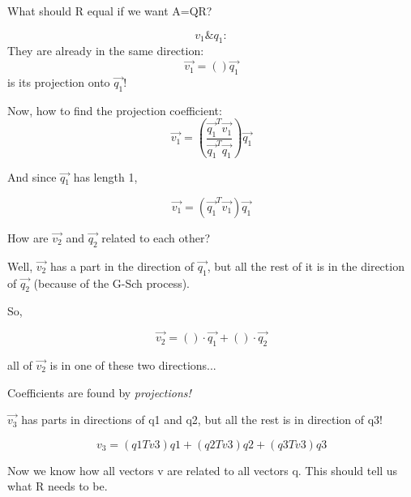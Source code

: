 \documentclass[twocolumn,draft]{article}
\begin{document}
  What should R equal if we want A=QR?
  
  \begin{equation}
  	v_{1} \& q_{1}:
  \end{equation}
  They are already in the same direction:
  \begin{equation}
  	\vec{v_{1}} = ()\vec{q_{1}}
  \end{equation}
  is its projection onto $\vec{q_{1}}$!
  
  Now, how to find the projection coefficient:
  \begin{equation}
  	\vec{v_{1}} = (\frac{\vec{q_{1}}^{T}\vec{v_{1}}}{\vec{q_{1}}^{T}\vec{q_{1}}})\vec{q_{1}}
  \end{equation}
  
  And since $\vec{q{_1}}$ has length 1, 
  
  \begin{equation}
  	\boxed{\vec{v_{1}} = (\vec{q_{1}}^{T}\vec{v_{1}})\vec{q_{1}}}
  \end{equation}
  
  How are $\vec{v_{2}}$ and $\vec{q_{2}}$ related to each other?
  
  Well, $\vec{v_{2}}$ has a part in the direction of $\vec{q_{1}}$, but
  all the rest of it is in the direction of $\vec{q_{2}}$ (because of the G-Sch process).
  
  So,
  
  \begin{equation}
  	\vec{v_{2}}= ( )\cdot \vec{q_{1}} + ( )\cdot \vec{q_{2}}
  \end{equation}
  
  all of $\vec{v_{2}}$ is in one of these two directions...
  
  Coefficients are found by \emph{projections!}
  
 
 $\vec{v_{3}}$ has parts in directions of q1 and q2, but all the rest is in direction of q3!
 
 \begin{equation}
 	v_{3} = (q1Tv3)q1 + (q2Tv3)q2 + (q3Tv3)q3
 \end{equation}
 
 Now we know how all vectors v are related to all vectors q. This should tell us what R needs to be.
 
\end{document}

